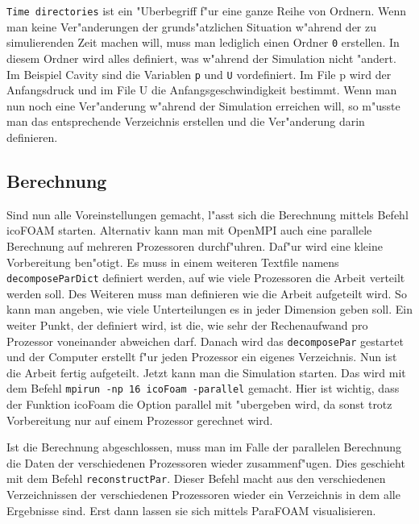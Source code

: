 \begin{refsection}
\texttt{Time directories} ist ein "Uberbegriff f"ur eine ganze Reihe von
Ordnern. Wenn man keine Ver"anderungen der grunds"atzlichen Situation
w"ahrend der zu simulierenden Zeit machen will, muss man lediglich einen
Ordner  \texttt{0} erstellen. In diesem Ordner wird alles definiert,
was w"ahrend der Simulation nicht "andert. Im Beispiel Cavity sind die
Variablen  \texttt{p} und  \texttt{U} vordefiniert. Im File p wird der
Anfangsdruck und im File U die Anfangsgeschwindigkeit bestimmt. Wenn man
nun noch eine Ver"anderung w"ahrend der Simulation erreichen will, so
m"usste man das entsprechende Verzeichnis erstellen und die Ver"anderung
darin definieren.

\subsection{Berechnung}
Sind nun alle Voreinstellungen gemacht, l"asst sich die Berechnung
mittels Befehl icoFOAM starten. Alternativ kann man mit OpenMPI auch
eine parallele Berechnung auf mehreren Prozessoren durchf"uhren. Daf"ur
wird eine kleine Vorbereitung ben"otigt. Es muss in einem weiteren
Textfile namens \texttt{decomposeParDict} definiert werden, auf wie
viele Prozessoren die Arbeit verteilt werden soll. Des Weiteren muss
man definieren wie die Arbeit aufgeteilt wird. So kann man angeben, wie
viele Unterteilungen es in jeder Dimension geben soll. Ein weiter Punkt,
der definiert wird, ist die, wie sehr der Rechenaufwand pro Prozessor
voneinander abweichen darf. Danach wird das \texttt{decomposePar}
gestartet und der Computer erstellt f"ur jeden Prozessor ein eigenes
Verzeichnis. Nun ist die Arbeit fertig aufgeteilt. Jetzt kann man
die Simulation starten. Das wird mit dem Befehl \texttt{mpirun -np 16
icoFoam -parallel} gemacht. Hier ist wichtig, dass der Funktion icoFoam
die Option parallel mit "ubergeben wird, da sonst trotz Vorbereitung
nur auf einem Prozessor gerechnet wird.

Ist die Berechnung abgeschlossen, muss man im Falle
der parallelen Berechnung die Daten der verschiedenen
Prozessoren wieder zusammenf"ugen. Dies geschieht mit dem Befehl
\texttt{reconstructPar}. Dieser Befehl macht aus den verschiedenen
Verzeichnissen der verschiedenen Prozessoren wieder ein Verzeichnis in
dem alle Ergebnisse sind. Erst dann lassen sie sich mittels ParaFOAM
visualisieren.


\end{refsection}
